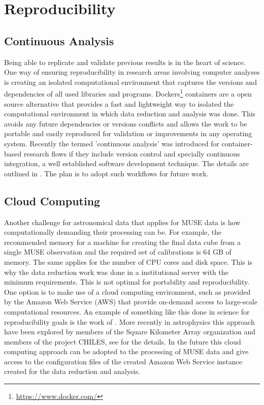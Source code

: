

\section{Reproducibility}


\subsection{Continuous Analysis}


Being able to replicate and validate previous results is in the heart of science. One way of ensuring reproducibility in research areas involving computer analyses is creating an isolated computational environment that captures the versions and dependencies of all used libraries and programs. Dockers\footnote{\url{https://www.docker.com/}} containers are a open source alternative that provides a fast and lightweight way to isolated the computational environment in which data reduction and analysis was done. This  avoids any future dependencies or versions conflicts and allows the work to be portable and easily reproduced for validation or improvements in any operating system. Recently the termed 'continuous analysis' was introduced for container-based research flows if they include version control and specially continuous integration, a well established software development technique. The details are outlined in \cite{Beaulieu-Jones056473}. The plan is to adopt such workflows for future work.  

\subsection{Cloud Computing}

Another challenge for astronomical data that applies for MUSE data is how computationally demanding their processing can be. For example, the recommended memory for a machine for creating the final data cube from a single MUSE observation and the required set of calibrations is 64 GB of memory. The same applies for the number of CPU cores and disk space. This is why the data reduction work was done in a institutional server with the minimum requirements. This is not optimal for portability and reproducibility. One option is to make use of a cloud computing environment, such as provided by the Amazon Web Service (AWS) that provide on-demand access to large-scale computational resources. An example of something like this done in science for reproducibility goals is the work of \cite{ragan-kelley_collaborative_2013}. More recently in astrophysics this approach have been explored by members of the Square Kilometer Array organization and members of the project CHILES, see \cite{Dodson_SKAAmazon_2016} for the details. In the future this cloud computing approach can be adopted to the processing of MUSE data and give access to the configuration files of the created Amazon Web Service instance created for the data reduction and analysis.  

